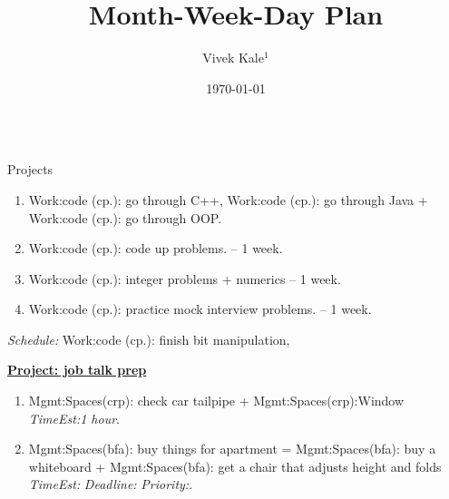 \documentclass[serif, mathserif, final]{beamer}
\title{Month-Week-Day Plan}\author{Vivek Kale$^1$}\institute{$^1$ University of Illinois at Urbana-Champaign}\date{\today}
\newcommand{\te}[1]{\textit{TimeEst:}\textit{#1}}
\newcommand{\dl}[1]{\textit{Deadline:}\textit{#1}}
\newcommand{\pr}[1]{\textit{Priority:}\textit{#1}}
\begin{document}
\begin{frame}
\begin{columns}

\begin{column}{0.5\textwidth}
\begin{block}{Projects}
\begin{enumerate}
\tiny \item \tiny Work:code (cp.): go through C++, Work:code (cp.): go through Java + Work:code (cp.): go through OOP. 
\item \tiny Work:code (cp.): code up problems.  – 1 week.
\item \tiny Work:code (cp.): integer problems + numerics   -- 1 week. 
\item \tiny Work:code (cp.): practice mock interview problems. – 1 week. 
\end{enumerate}
{\it Schedule:} Work:code (cp.): finish bit manipulation,


{\underline{\bf Project: job talk prep}}
\begin{enumerate} 
\item \tiny Mgmt:Spaces(crp): check car tailpipe +
  Mgmt:Spaces(crp):Window \te{1 hour}.
\item \tiny Mgmt:Spaces(bfa): buy things for apartment =
  Mgmt:Spaces(bfa): buy a whiteboard + Mgmt:Spaces(bfa): get a chair
  that adjusts height and folds \te{} \dl{} \pr{}. 


\end{enumerate}


\end{block}
\end{column}
\end{columns}
\end{frame}
\end{document}
